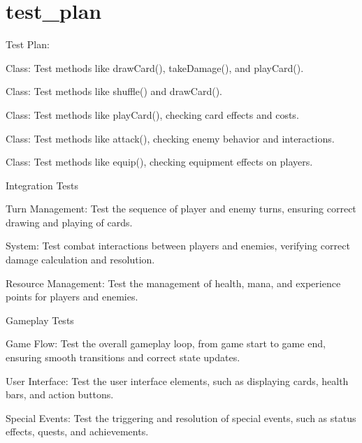 \chapter{test\+\_\+plan}
\hypertarget{md_docs_2architecture_2test__plan}{}\label{md_docs_2architecture_2test__plan}
Test Plan\+:


\begin{DoxyEnumerate}
\item {} Class\+: Test methods like draw\+Card(), take\+Damage(), and play\+Card().
\begin{DoxyItemize}
\item {} Class\+: Test methods like shuffle() and draw\+Card().
\item {} Class\+: Test methods like play\+Card(), checking card effects and costs.
\item {} Class\+: Test methods like attack(), checking enemy behavior and interactions.
\item {} Class\+: Test methods like equip(), checking equipment effects on players.
\end{DoxyItemize}
\item Integration Tests
\begin{DoxyItemize}
\item Turn Management\+: Test the sequence of player and enemy turns, ensuring correct drawing and playing of cards.
\item {} System\+: Test combat interactions between players and enemies, verifying correct damage calculation and resolution.
\item Resource Management\+: Test the management of health, mana, and experience points for players and enemies.
\end{DoxyItemize}
\item Gameplay Tests
\begin{DoxyItemize}
\item Game Flow\+: Test the overall gameplay loop, from game start to game end, ensuring smooth transitions and correct state updates.
\item User Interface\+: Test the user interface elements, such as displaying cards, health bars, and action buttons.
\item Special Events\+: Test the triggering and resolution of special events, such as status effects, quests, and achievements.
\end{DoxyItemize}

\end{DoxyEnumerate}
